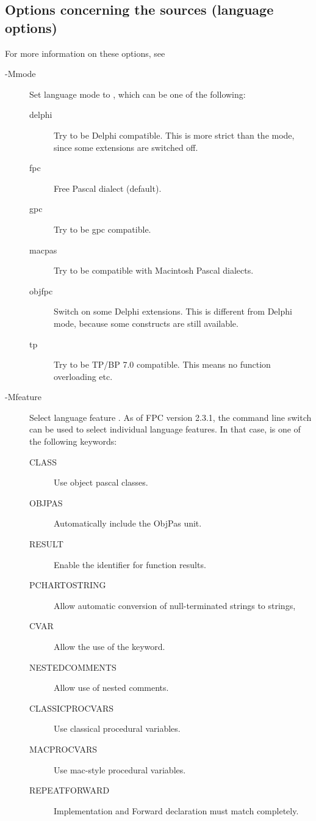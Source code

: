 \subsection{Options concerning the sources (language options)}
\label{se:sourceoptions}
For more information on these options, see \progref
\begin{description}
\item[-Mmode]  Set language mode to , which can be one of the
following:
\begin{description}
\item[delphi] Try to be Delphi compatible. This is more strict
than the  mode, since some \fpc extensions are switched off.
\item[fpc] Free Pascal dialect (default).
\item[gpc] Try to be gpc compatible.
\item[macpas] Try to be compatible with Macintosh Pascal dialects.
\item[objfpc] Switch on some Delphi extensions. This is different from 
Delphi mode, because some \fpc constructs are still available.
\item[tp] Try to be TP/BP 7.0 compatible. This means no function overloading
etc.
\end{description}
\item[-Mfeature]  Select language feature .
As of FPC version 2.3.1, the  command line switch can be used to select individual
language features. In that case,  is one of the following keywords:
\begin{description}
\item[CLASS] Use object pascal classes.
\item[OBJPAS] Automatically include the ObjPas unit.
\item[RESULT] Enable the  identifier for function results.
\item[PCHARTOSTRING] Allow automatic conversion of null-terminated strings
to strings,
\item[CVAR] Allow the use of the  keyword.
\item[NESTEDCOMMENTS] Allow use of nested comments.
\item[CLASSICPROCVARS] Use classical procedural variables.
\item[MACPROCVARS] Use mac-style procedural variables.
\item[REPEATFORWARD] Implementation and Forward declaration must match completely.

\end{description}
\end{description}
